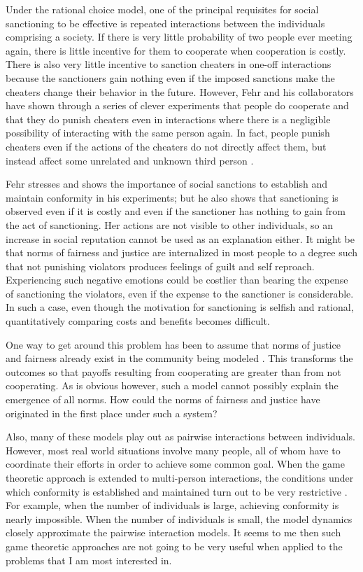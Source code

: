 \documentclass[rutwik_proposal.tex]{subfiles}
\begin{document}
Under the rational choice model, one of the principal requisites for social sanctioning to be effective is repeated interactions between the individuals comprising a society. If there is very little probability of two people ever meeting again, there is little incentive for them to cooperate when cooperation is costly. There is also very little incentive to sanction cheaters in one-off interactions because the sanctioners gain nothing even if the imposed sanctions make the cheaters change their behavior in the future. However, Fehr and his collaborators have shown through a series of clever experiments that people do cooperate and that they do punish cheaters even in interactions where there is a negligible possibility of interacting with the same person again. In fact, people punish cheaters even if the actions of the cheaters do not directly affect them, but instead affect some unrelated and unknown third person \cite{Fehr02, Fehr03, Fehr04}.

Fehr stresses and shows the importance of social sanctions to establish and maintain conformity in his experiments; but he also shows that sanctioning is observed even if it is costly and even if the sanctioner has nothing to gain from the act of sanctioning. Her actions are not visible to other individuals, so an increase in social reputation cannot be used as an explanation either. It might be that norms of fairness and justice are internalized in most people to a degree such that not punishing violators produces feelings of guilt and self reproach. Experiencing such negative emotions could be costlier than bearing the expense of sanctioning the violators, even if the expense to the sanctioner is considerable. In such a case, even though the motivation for sanctioning is selfish and rational, quantitatively comparing costs and benefits becomes difficult.

One way to get around this problem has been to assume that norms of justice and fairness already exist in the community being modeled \cite{Bicchieri14}. This transforms the outcomes so that payoffs resulting from cooperating are greater than from not cooperating. As is obvious however, such a model cannot possibly explain the emergence of all norms. How could the norms of fairness and justice have originated in the first place under such a system?

Also, many of these models play out as pairwise interactions between individuals. However, most real world situations involve many people, all of whom have to coordinate their efforts in order to achieve some common goal. When the game theoretic approach is extended to multi-person interactions, the conditions under which conformity is established and maintained turn out to be very restrictive \cite{Boyd88}. For example, when the number of individuals is large, achieving conformity is nearly impossible. When the number of individuals is small, the model dynamics closely approximate the pairwise interaction models. It seems to me then such game theoretic approaches are not going to be very useful when applied to the problems that I am most interested in.
\end{document}

